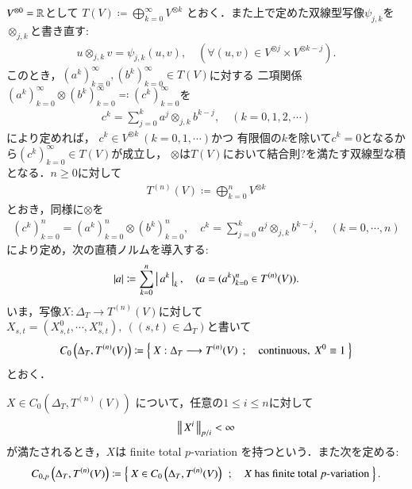 	
	$V^{\otimes 0} = \mathbb{R}$として
	$T(V) \coloneqq \bigoplus_{k=0}^{\infty} V^{\otimes k}$
	とおく．また上で定めた双線型写像$\psi_{j,k}$を$\otimes_{j,k}$と書き直す:
	\begin{align}
		u \otimes_{j,k} v = \psi_{j,k}(u,v),
		\quad (\forall (u,v) \in V^{\otimes j} \times V^{\otimes k-j}).
	\end{align}
	このとき，$(a^k)_{k=0}^{\infty},(b^k)_{k=0}^{\infty} \in T(V)$に対する
	二項関係$(a^k)_{k=0}^{\infty} \otimes (b^k)_{k=0}^{\infty} \eqqcolon (c^k)_{k=0}^{\infty}$を
	\begin{align}
		c^k = \sum_{j=0}^{k} a^j \otimes_{j,k} b^{k-j},
		\quad (k=0,1,2,\cdots)
	\end{align}
	により定めれば，
	$c^k \in V^{\otimes k}\ (k=0,1,\cdots)$かつ
	有限個の$k$を除いて$c^k = 0$となるから$(c^k)_{k=0}^\infty \in T(V)$が成立し，
	$\otimes$は$T(V)$において結合則?を満たす双線型な積となる．$n \geq 0$に対して
	\begin{align}
		T^{(n)}(V) \coloneqq \bigoplus_{k=0}^{n} V^{\otimes k}
	\end{align}
	とおき，同様に$\otimes$を
	\begin{align}
		(c^k)_{k=0}^n = (a^k)_{k=0}^n \otimes (b^k)_{k=0}^n,
		\quad c^k = \sum_{j=0}^{k} a^j \otimes_{j,k} b^{k-j},
		\quad (k=0,\cdots,n)
	\end{align}
	により定め，次の直積ノルムを導入する:
	\begin{align}
		|a| \coloneqq \sum_{k=0}^n \left|\, a^k\, \right|_{k},
		\quad (a = (a^k)_{k=0}^n \in T^{(n)}(V)).
	\end{align}
	いま，写像$X:\Delta_T \longrightarrow T^{(n)}(V)$に対して
	$X_{s,t} = (X^0_{s,t},\cdots,X^n_{s,t}),\ ((s,t) \in \Delta_T)$と書いて
	\begin{align}
		C_0 \left(\Delta_T,T^{(n)}(V) \right)
		\coloneqq \left\{\ X:\Delta_T \longrightarrow T^{(n)}(V)\ \, ; \quad \mbox{continuous},\ X^0 \equiv 1\ \right\}
	\end{align}
	とおく．
	
	\begin{screen}
		\begin{dfn}
			$X \in C_0 \left(\Delta_T,T^{(n)}(V) \right)$
			について，任意の$1 \leq i \leq n$に対して
			\begin{align}
				\left\|\, X^i\, \right\|_{p/i} < \infty
			\end{align}
			が満たされるとき，$X$は finite total $p$-variation を持つという．また次を定める:
			\begin{align}
				C_{0,p} \left(\Delta_T,T^{(n)}(V) \right)
				\coloneqq \left\{\ X \in C_0 \left(\Delta_T,T^{(n)}(V) \right)\ \, ; \quad \mbox{$X$ has finite total $p$-variation}\ \right\}	.
			\end{align}
		\end{dfn}
	\end{screen}
	
